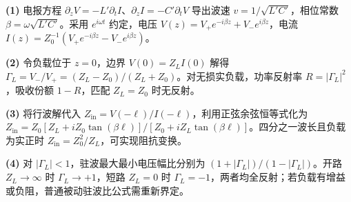 \par\noindent\textbf{(1)} 电报方程 \(\partial_zV=-L'\partial_tI\)、\(\partial_zI=-C'\partial_tV\) 导出波速 \(v=1/\sqrt{L'C'}\)，相位常数 \(\beta=\omega\sqrt{L'C'}\)。采用 \(e^{i\omega t}\) 约定，电压 \(V(z)=V_+e^{-i\beta z}+V_-e^{i\beta z}\)，电流 \(I(z)=Z_0^{-1}(V_+e^{-i\beta z}-V_-e^{i\beta z})\)。
\par\noindent\textbf{(2)} 令负载位于 \(z=0\)，边界 \(V(0)=Z_LI(0)\) 解得 \(\Gamma_L=V_-/V_+=(Z_L-Z_0)/(Z_L+Z_0)\)。对无损实负载，功率反射率 \(R=|\Gamma_L|^2\)，吸收份额 \(1-R\)，匹配 \(Z_L=Z_0\) 时无反射。
\par\noindent\textbf{(3)} 将行波解代入 \(Z_{\mathrm{in}}=V(-\ell)/I(-\ell)\)，利用正弦余弦恒等式化为 \(Z_{\mathrm{in}}=Z_0[Z_L+iZ_0\tan(\beta\ell)]/[Z_0+iZ_L\tan(\beta\ell)]\)。四分之一波长且负载为实正时 \(Z_{\mathrm{in}}=Z_0^2/Z_L\)，可实现阻抗变换。
\par\noindent\textbf{(4)} 对 \(|\Gamma_L|<1\)，驻波最大最小电压幅比分别为 \((1+|\Gamma_L|)/(1-|\Gamma_L|)\)。开路 \(Z_L\to\infty\) 时 \(\Gamma_L\to+1\)，短路 \(Z_L=0\) 时 \(\Gamma_L=-1\)，两者均全反射；若负载有增益或负阻，普通被动驻波比公式需重新界定。

